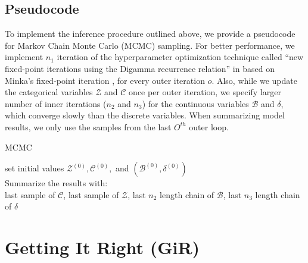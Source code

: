 \documentclass[a4paper]{article}
\begin{document}
 \subsection{Pseudocode}  \label{subsec: Pseudocode}
 To implement the inference procedure outlined above, we provide a pseudocode for Markov Chain Monte Carlo (MCMC) sampling. For better performance, we implement $n_1$ iteration of the hyperparameter optimization technique called ``new fixed-point iterations using the Digamma recurrence relation'' in \cite{wallach2008structured} based on Minka’s fixed-point iteration \citep{minka2000estimating}, for every outer iteration $o$. Also, while we update the categorical variables $\mathcal{Z}$ and $\mathcal{C}$ once per outer iteration, we specify larger number of inner iterations ($n_2$ and $n_3$) for the continuous variables $\mathcal{B}$ and $\delta$, which converge slowly than the discrete variables. When summarizing model results, we only use the samples from the last $O^{th}$ outer loop.
 \begin{algorithm}[H]
 	\SetAlgoLined
 	\caption{MCMC}
 	set initial values $\mathcal{Z}^{(0)}, \mathcal{C}^{(0)}, $ and $(\mathcal{B}^{(0)}, \delta^{(0)})$\\
 		Summarize the results with:\\
 	last sample of $\mathcal{C}$, last sample of $\mathcal{Z}$, last $n_2$ length chain of $\mathcal{B}$, last $n_3$ length chain of $\delta$ 
 \end{algorithm}
   \section{Getting It Right (GiR)}
\end{document}
